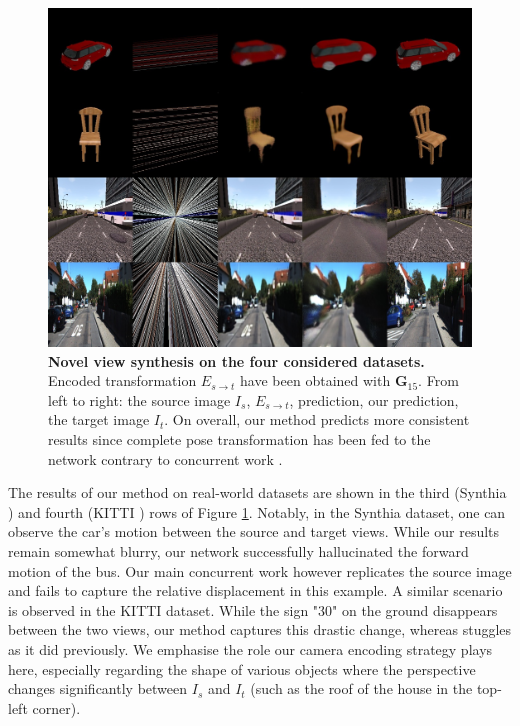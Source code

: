\begin{figure}[h!]
    \begin{center}
    \includegraphics[width=\textwidth]{images/epipolarnvs/resultsFinal_BMVC.jpg}
    \end{center}
     \caption{\textbf{Novel view synthesis on the four considered datasets.} Encoded transformation $E_{s\xrightarrow{}t}$ have been obtained with $\textbf{G}_{15}$. From left to right: the source image  $I_s$, $E_{s\xrightarrow{}t}$, \citep{kim2020novel} prediction, our prediction, the target image $I_t$. On overall, our method predicts more consistent results since complete pose transformation has been fed to the network contrary to concurrent work \citep{kim2020novel}. }
     \label{fig:res_all}
\end{figure}

The results of our method on real-world datasets are shown in the third (Synthia \citep{ros2016synthia}) and fourth (KITTI \citep{geiger2012we}) rows of Figure \ref{fig:res_all}. Notably, in the Synthia \citep{ros2016synthia} dataset, one can observe the car’s motion between the source and target views. While our results remain somewhat blurry, our network successfully hallucinated the forward motion of the bus. Our main concurrent work however replicates the source image and fails to capture the relative displacement in this example. A similar scenario is observed in the KITTI \citep{geiger2012we} dataset. While the sign "30" on the ground disappears between the two views, our method captures this drastic change,  whereas \citep{kim2020novel} stuggles as it did previously. We emphasise the role our camera encoding strategy plays here, especially regarding the shape of various objects where the perspective changes significantly between $I_s$ and $I_t$ (such as the roof of the house in the top-left corner). \newline


